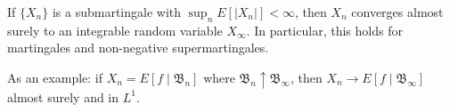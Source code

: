If $\{X_n\}$ is a submartingale with $\sup_n E[|X_n|] < \infty$, then $X_n$ converges almost surely to an integrable random variable $X_\infty$. In particular, this holds for martingales and non-negative supermartingales.

As an example: if $X_n = E[f \mid \mathfrak{B}_n]$ where $\mathfrak{B}_n \uparrow \mathfrak{B}_\infty$, then $X_n \to E[f \mid \mathfrak{B}_\infty]$ almost surely and in $L^1$.
